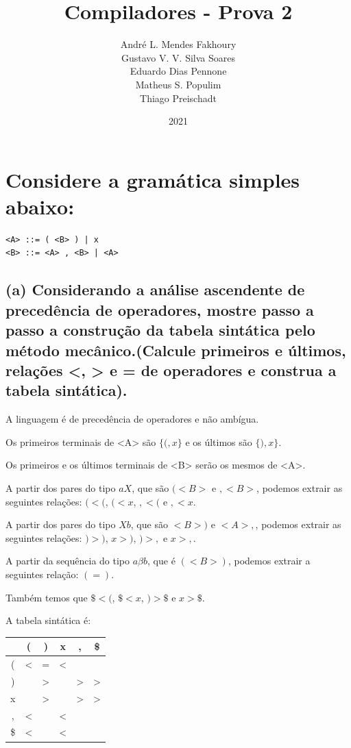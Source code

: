 \documentclass{article}
\title{Compiladores - Prova 2}
\author{André L. Mendes Fakhoury\\
Gustavo V. V. Silva Soares\\
Eduardo Dias Pennone\\
Matheus S. Populim\\
Thiago Preischadt\\
}
\date{2021}
\begin{document}
\maketitle

\section{Considere a gramática simples abaixo:}
\begin{lstlisting}
<A> ::= ( <B> ) | x
<B> ::= <A> , <B> | <A>
\end{lstlisting}

\subsection{(a) Considerando a análise ascendente de precedência de operadores, mostre passo a passo a construção da tabela sintática pelo método mecânico.(Calcule primeiros e últimos, relações <, > e = de operadores e construa a tabela sintática).}

A linguagem é de precedência de operadores e não ambígua.

Os primeiros terminais de <A> são $\{(, x\}$ e os últimos são $\{), x\}$.

Os primeiros e os últimos terminais de <B> serão os mesmos de <A>.

A partir dos pares do tipo $aX$, que são $( <B>$ e $, <B>$, podemos extrair as seguintes relações: $( < ($, $( < x$, $, < ($ e $, < x$.

A partir dos pares do tipo $Xb$, que são $<B> )$ e $<A> ,$, podemos extrair as seguintes relações: $) > )$, $x > )$, $) > ,$ e $x > ,$.

A partir da sequência do tipo $a\beta b$, que é $( <B> )$, podemos extrair a seguintes relação: $( = )$.

Também temos que $\$ < ($, $\$ < x$, $) > \$$ e $x > \$$.

A tabela sintática é:
\begin{center}
\begin{tabular}{ |c|c|c|c|c|c| } 
\hline
  & ( & ) & x & , & \$ \\
\hline
( & < & = & < &   &  \\
\hline
) &   & > &   & > & >\\
\hline
x &   & > &   & > & >\\
\hline
, & < &   & < &   &  \\
\hline
\$ & < &   & < &   &  \\
\hline
\end{tabular}
\end{center}
\end{document}
